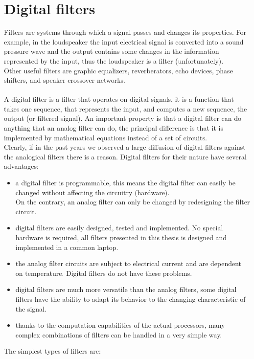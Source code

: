 \chapter{Digital filters}
Filters are systems through which a signal passes and changes its properties. For example, in the loudspeaker the input electrical signal is converted into a sound pressure wave and the output contains some changes in the information represented by the input, thus the loudspeaker is a filter (unfortunately).\\ 
Other useful filters are graphic equalizers, reverberators, echo devices, phase shifters, and speaker crossover networks.\\\\
A digital filter is a filter that operates on digital signals, it is a function that takes one sequence, that represents the input, and computes a new sequence, the output (or filtered signal). An important property is that a digital filter can do anything that an analog filter can do, the principal difference is that it is implemented by mathematical equations instead of a set of circuits.\\
Clearly, if in the past years we observed a large diffusion of digital filters against the analogical filters there is a reason. Digital filters for their nature have several advantages:
\begin{itemize}
\item a digital filter is programmable, this means the digital filter can easily be changed without affecting the circuitry (hardware).\\
On the contrary, an analog filter can only be changed by redesigning the filter circuit.
\item digital filters are easily designed, tested and implemented. No special hardware is required, all filters presented in this thesis is designed and implemented in a common laptop.
\item the analog filter circuits are subject to electrical current and are dependent on temperature. Digital filters do not have these problems.
\item digital filters are much more versatile than the analog filters, some digital filters have the ability to adapt its behavior to the changing characteristic of the signal. 
\item thanks to the computation capabilities of the actual processors, many complex combinations of filters can be handled in a very simple way. 
\end{itemize}
The simplest types of filters are:\\
